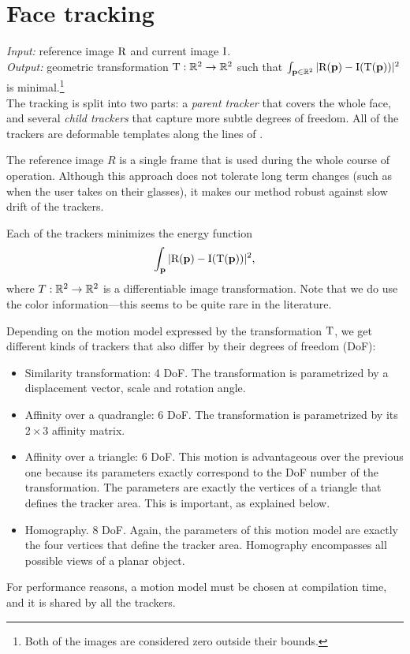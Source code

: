 \section{Face tracking}
\label{s:impl-face}

\textit{Input:} reference image $\mathrm{R}$ and current image $\mathrm{I}$.\\
\textit{Output:} geometric transformation $\mathrm{T}: \mathbb{R}^2 \to \mathbb{R}^2$ such that $\int_{\mathbf{p} \in \mathbb{R}^2} |\mathrm{R}(\mathbf{p}) - \mathrm{I}(\mathrm{T}(\mathbf{p}))|^2$ is minimal.\footnote{
Both of the images are considered zero outside their bounds.
}\\

The tracking is split into two parts: a \textit{parent tracker} that covers the whole face, and several \textit{child trackers} that capture more subtle degrees of freedom.
All of the trackers are deformable templates along the lines of \cite{bouguet01}.

The reference image $R$ is a single frame that is used during the whole course of operation.
Although this approach does not tolerate long term changes (such as when the user takes on their glasses), it makes our method robust against slow drift of the trackers.

Each of the trackers minimizes the energy function
$$\int_{\mathbf{p}} |\mathrm{R}(\mathbf{p}) - \mathrm{I}(\mathrm{T}(\mathbf{p}))|^2,$$
where $T: \mathbb{R}^2 \to \mathbb{R}^2$ is a differentiable image transformation.
Note that we do use the color information---this seems to be quite rare in the literature.

Depending on the motion model expressed by the transformation $\mathrm{T}$, we get different kinds of trackers that also differ by their degrees of freedom (DoF):
\begin{itemize}
\item
Similarity transformation: 4 DoF.
The transformation is parametrized by a displacement vector, scale and rotation angle.

\item
Affinity over a quadrangle: 6 DoF.
The transformation is parametrized by its $2 \times 3$ affinity matrix.

\item
Affinity over a triangle: 6 DoF.
This motion is advantageous over the previous one because its parameters exactly correspond to the DoF number of the transformation.
The parameters are exactly the vertices of a triangle that defines the tracker area.
This is important, as explained below.

\item
Homography. 8 DoF.
Again, the parameters of this motion model are exactly the four vertices that define the tracker area.
Homography encompasses all possible views of a planar object.

\end{itemize}
For performance reasons, a motion model must be chosen at compilation time, and it is shared by all the trackers.

